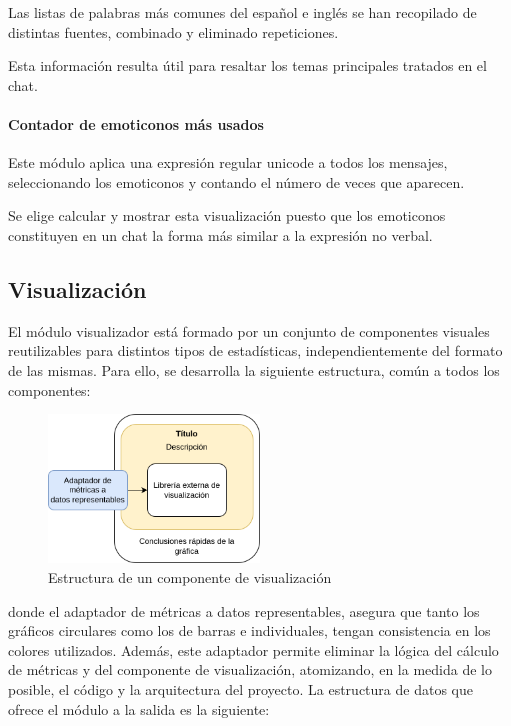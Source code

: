 Las listas de palabras más comunes del español e inglés se han recopilado de distintas fuentes, combinado y eliminado repeticiones.

Esta información resulta útil para resaltar los temas principales tratados en el chat.

\paragraph{Contador de emoticonos más usados}

Este módulo aplica una expresión regular unicode a todos los mensajes, seleccionando los emoticonos y contando el número de veces que aparecen.

Se elige calcular y mostrar esta visualización puesto que los emoticonos constituyen en un chat la forma más similar a la expresión no verbal.

\subsection{Visualización}

El módulo visualizador está formado por un conjunto de componentes visuales reutilizables para distintos tipos de estadísticas, independientemente del formato de las mismas. Para ello, se desarrolla la siguiente estructura, común a todos los componentes:

\begin{figure}[H]
	\centering
	\includegraphics[width=0.5\textwidth]{img/visualizadores.png}
	\caption{Estructura de un componente de visualización}
	\label{fig:chap4:visualization}
\end{figure}

donde el adaptador de métricas a datos representables, asegura que tanto los gráficos circulares como los de barras e individuales, tengan consistencia en los colores utilizados. Además, este adaptador permite eliminar la lógica del cálculo de métricas y del componente de visualización, atomizando, en la medida de lo posible, el código y la arquitectura del proyecto. La estructura de datos que ofrece el módulo a la salida es la siguiente:

